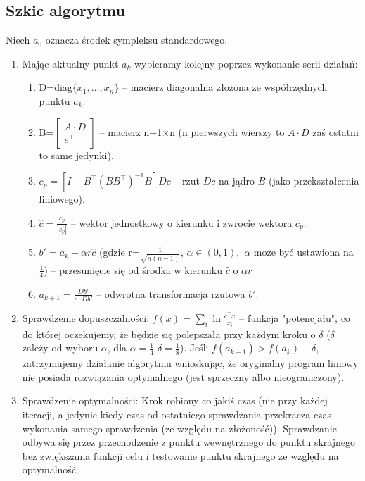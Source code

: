 \documentclass[licencjacka]{pracamgr}
\begin{document}
   \subsection{Szkic algorytmu}
Niech $a_0$ oznacza środek sympleksu standardowego.
\begin{enumerate}
\item Mając aktualny punkt $a_k$ wybieramy kolejny poprzez wykonanie serii działań:
\begin{enumerate}
\item D=diag$\{x_1,...,x_n\}$ -- macierz diagonalna złożona ze współrzędnych punktu $a_k$.
\item B=$\left[\begin{array}{c}A\cdot D\\e^{\top}\end{array}\right]$ -- macierz n+1$\times$n (n pierwszych wierszy to $A\cdot D$ zaś ostatni to same jedynki).
\item $c_p=\left[I-B^{\top}(BB^{\top})^{-1}B\right]Dc$ -- rzut $Dc$ na jądro $B$ (jako przekształcenia liniowego).
\item $\hat{c}=\frac{c_p}{|c_p|}$ -- wektor jednostkowy o kierunku i zwrocie wektora $c_p$.
\item $b'=a_k-\alpha r\hat{c}$ (gdzie r=$\frac{1}{\sqrt{n(n-1)}}$, $\alpha\in (0,1),$ $\alpha$ może być ustawiona na $\frac{1}{4}$) -- przesunięcie się od środka w kierunku $\hat{c}$ o $\alpha r$
\item $a_{k+1}=\frac{Db'}{e^{\top}Db'}$ -- odwrotna transformacja rzutowa $b'$.
\end{enumerate}
%
\item Sprawdzenie dopuszczalności:\newline
$f(x)=\sum\limits_{i}\ln{\frac{c^{\top}x}{x_i}}$ -- funkcja "potencjału", co do której oczekujemy, że będzie się polepszała przy każdym kroku o $\delta$
($\delta$ zależy od wyboru $\alpha$, dla $\alpha=\frac{1}{4}$ $\delta=\frac{1}{8}$). Jeśli $f(a_{k+1})>f(a_k)-\delta$, zatrzymujemy działanie algorytmu wnioskując,
że oryginalny program liniowy nie posiada rozwiązania optymalnego (jest sprzeczny albo nieograniczony).\newline\newline
%
\item Sprawdzenie optymalności:\newline
Krok robiony co jakiś czas (nie przy każdej iteracji, a jedynie kiedy czas od ostatniego sprawdzania przekracza czas wykonania samego sprawdzenia (ze względu na złożoność)).
Sprawdzanie odbywa się przez przechodzenie z punktu wewnętrznego do punktu skrajnego bez zwiększania funkcji celu i testowanie punktu skrajnego ze względu na optymalność.\newline
\end{enumerate}
%
\end{document}
